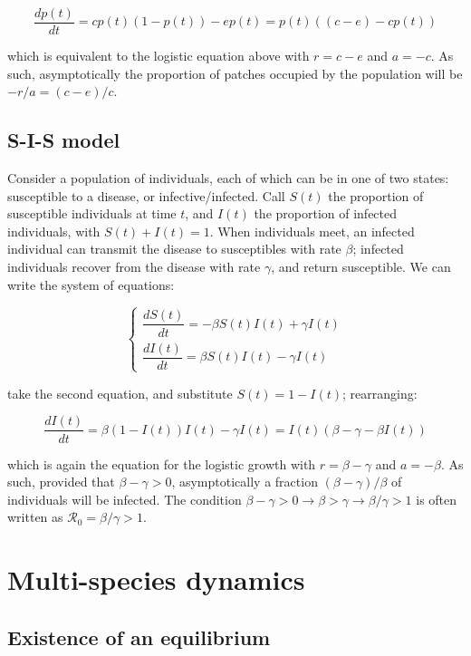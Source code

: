 \documentclass[
]{book}
\begin{document}
\[
\dfrac{d p(t)}{dt} = c p(t)(1 - p(t)) - e p(t) = p(t) ((c - e) - c  p(t))
\]

which is equivalent to the logistic equation above with \(r = c-e\) and \(a = -c\). As such, asymptotically the proportion of patches occupied by the population will be \(-r/a = (c -e) / c\).

\hypertarget{s-i-s-model}{%
\subsection{S-I-S model}\label{s-i-s-model}}

Consider a population of individuals, each of which can be in one of two states: susceptible to a disease, or infective/infected. Call \(S(t)\) the proportion of susceptible individuals at time \(t\), and \(I(t)\) the proportion of infected individuals, with \(S(t) + I(t) = 1\). When individuals meet, an infected individual can transmit the disease to susceptibles with rate \(\beta\); infected individuals recover from the disease with rate \(\gamma\), and return susceptible. We can write the system of equations:

\[
\begin{cases}
\dfrac{d S(t)}{dt} = -\beta S(t) I(t) + \gamma I(t)\\
\dfrac{d I(t)}{dt} = \beta S(t) I(t) - \gamma I(t)
\end{cases}
\]

take the second equation, and substitute \(S(t) = 1 - I(t)\); rearranging:

\[
\dfrac{d I(t)}{dt} = \beta (1-I(t)) I(t) - \gamma I(t) = I(t)(\beta - \gamma -\beta I(t))
\]

which is again the equation for the logistic growth with \(r = \beta - \gamma\) and \(a = -\beta\). As such, provided that \(\beta -\gamma > 0\), asymptotically a fraction \((\beta - \gamma) / \beta\) of individuals will be infected. The condition \(\beta -\gamma > 0 \to \beta > \gamma \to \beta/ \gamma > 1\) is often written as \(\mathcal R_0 = \beta/ \gamma > 1\).

\hypertarget{multi-species-dynamics}{%
\section{Multi-species dynamics}\label{multi-species-dynamics}}

\hypertarget{existence-of-an-equilibrium}{%
\subsection{Existence of an equilibrium}\label{existence-of-an-equilibrium}}
\end{document}
